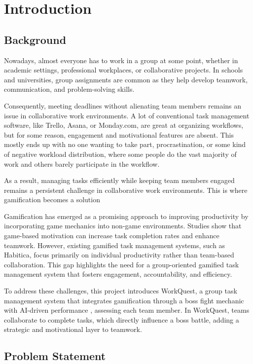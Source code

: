 \chapter{Introduction}
\label{chap:introduction}

\section{Background}
\label{section:background}

Nowadays, almost everyone has to work in a group at some point, whether in academic settings, professional workplaces, or collaborative projects. In schools and universities, group assignments are common as they help develop teamwork, communication, and problem-solving skills. 

Consequently, meeting deadlines without alienating team members remains an issue in collaborative work environments. A lot of conventional task management software, like Trello, Asana, or Monday.com, are great at organizing workflows, but for some reason, engagement and motivational features are absent. This mostly ends up with no one wanting to take part, procrastination, or some kind of negative workload distribution, where some people do the vast majority of work and others barely participate in the workflow.

As a result, managing tasks efficiently while keeping team members engaged remains a persistent challenge in collaborative work environments. This is where gamification becomes a solution


Gamification has emerged as a promising approach to improving productivity by incorporating game mechanics into non-game environments. Studies show that game-based motivation can increase task completion rates and enhance teamwork. However, existing gamified task management systems, such as Habitica, focus primarily on individual productivity rather than team-based collaboration. This gap highlights the need for a group-oriented gamified task management system that fosters engagement, accountability, and efficiency.

To address these challenges, this project introduces WorkQuest, a group task management system that integrates gamification through a boss fight mechanic with AI-driven performance , assessing each team member. In WorkQuest, teams collaborate to complete tasks, which directly influence a boss battle, adding a strategic and motivational layer to teamwork.

\section{Problem Statement}
\label{section:problem-statement}

